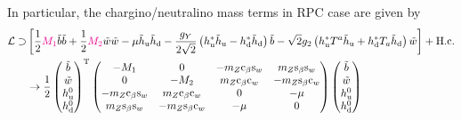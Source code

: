 \documentclass[CheatSheet]{subfiles}
\begin{document}
In particular, the chargino/neutralino mass terms in RPC case are given by
\begin{align}
 \mathcal L\supset
&\left[
  \frac12{{\color{magenta}M_1}}\tilde b\tilde b
+ \frac12{{\color{magenta}M_2}}\tilde w\tilde w
- \mu\tilde h_{\mathrm{u}}\tilde h_{\mathrm{d}}
- \frac{g_Y}{2\sqrt2} \left(h_{\mathrm{u}}^*\tilde h_{\mathrm{u}}-h_{\mathrm{d}}^*\tilde h_{\mathrm{d}}\right)\tilde b
- \sqrt{2}{g_2} \left(h_{\mathrm{u}}^*T^a\tilde h_{\mathrm{u}}+h_{\mathrm{d}}^*T_a\tilde h_{\mathrm{d}}\right)\tilde w
\right]+\text{H.c.}
\\
&\to
\frac{1}{2}
\begin{pmatrix}\tilde b \\ \tilde w \\ h_{\mathrm{u}}^0 \\ h_{\mathrm{d}}^0\end{pmatrix}^{\mathrm{T}}
\begin{pmatrix}
 -M_1 & 0 & -m_Z \mathrm{c}_{\beta} \mathrm{s}_{w} & m_Z \mathrm{s}_{\beta} \mathrm{s}_{w} \\
 0 & -M_ 2 & m_Z \mathrm{c}_{\beta} \mathrm{c}_{w} & -m_Z \mathrm{s}_{\beta} \mathrm{c}_{w} \\
 -m_Z \mathrm{c}_{\beta} \mathrm{s}_{w} & m_Z \mathrm{c}_{\beta} \mathrm{c}_{w} & 0 & -\mu  \\
 m_Z \mathrm{s}_{\beta} \mathrm{s}_{w} & -m_Z \mathrm{s}_{\beta} \mathrm{c}_{w} & -\mu  & 0
\end{pmatrix}
\begin{pmatrix}\tilde b \\ \tilde w \\ h_{\mathrm{u}}^0 \\ h_{\mathrm{d}}^0\end{pmatrix}
\end{align}
\end{document}
